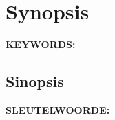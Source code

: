 \chapter*{Synopsis}

\noindent \textbf{KEYWORDS:} 

\begin{otherlanguage}{afrikaans}
\chapter*{Sinopsis}

\bigskip 

\noindent \textbf{SLEUTELWOORDE:} 

\end{otherlanguage} 


